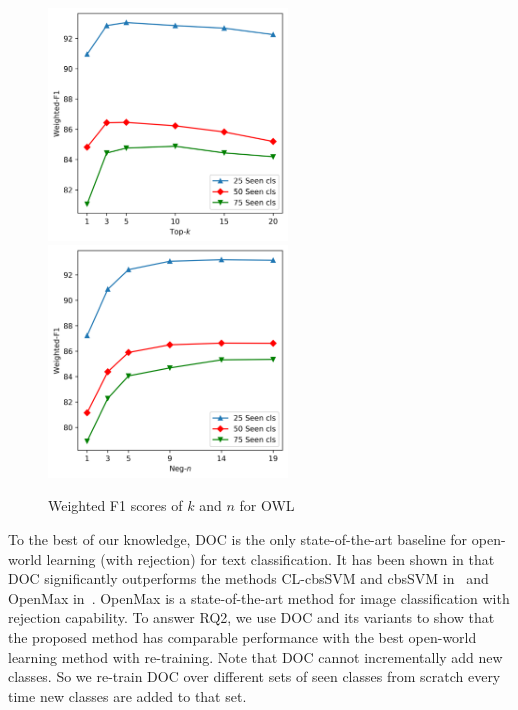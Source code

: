 
\begin{figure}
\center
\includegraphics[width=2.5in]{fig/www19_top_k.png}
\quad
\includegraphics[width=2.5in]{fig/www19_neg_n.png}
\caption{Weighted F1 scores of $k$ and $n$ for OWL}
\label{chap2:fig:kn}
\end{figure}

To the best of our knowledge, DOC \cite{shu-xu-liu:2017:EMNLP2017} is the only state-of-the-art baseline for open-world learning (with rejection) for text classification. It has been shown in \cite{shu-xu-liu:2017:EMNLP2017} that DOC significantly outperforms the methods CL-cbsSVM and cbsSVM in~\cite{fei2016learning} and OpenMax in~\cite{bendale2016towards}. OpenMax is a state-of-the-art method for image classification with rejection capability. 
To answer RQ2, we use DOC and its variants to show that the proposed method has comparable performance with the best open-world learning method with re-training.
Note that DOC cannot incrementally add new classes. 
So we re-train DOC over different sets of seen classes from scratch every time new classes are added to that set.

